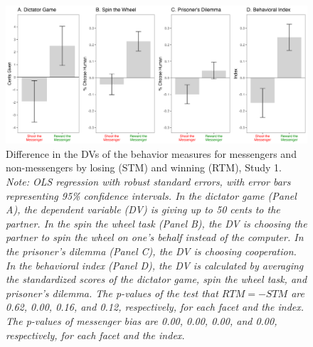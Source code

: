 \renewcommand{\baselinestretch}{1.25}%
\begin{figure}[!t]%
  \centering
  \includegraphics[width=1.0\textwidth]{figures/study1_behavior_list.png}
  \caption{Difference in the DVs of the behavior measures for messengers and non-messengers 
                                              by losing (STM) and winning (RTM), Study 1. 
  \textit{Note: OLS regression with robust standard errors, with error bars representing 95\% confidence intervals. In the dictator game (Panel A), the dependent variable (DV) is giving up to 50 cents to the partner. 
                 In the spin the wheel task (Panel B), the DV is choosing the partner to spin the wheel on one’s behalf instead of the computer. 
                 In the prisoner’s dilemma (Panel C), the DV is choosing cooperation. 
                 In the behavioral index (Panel D), the DV is calculated by averaging the standardized scores of the dictator game, spin the wheel task, and prisoner's dilemma. The p-values of the test that $RTM = -STM$ are 0.62, 0.00, 0.16, and 0.12, respectively, for each facet and the index. The p-values of messenger bias are 0.00, 0.00, 0.00, and 0.00, respectively, for each facet and the index.}}
  \label{fig:behavior_list}
\end{figure}%
\renewcommand{\baselinestretch}{1.67}%
